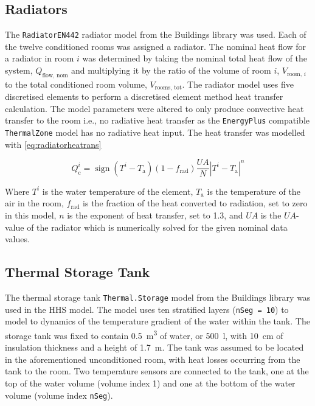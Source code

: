 \subsection{Radiators}
The \texttt{RadiatorEN442} radiator model from the Buildings library \cite{wetter_modelica_2014} was used. Each of the twelve conditioned rooms was assigned a radiator. The nominal heat flow for a radiator in room $i$ was determined by taking the nominal total heat flow of the system, $Q_\text{flow, nom}$ and multiplying it by the ratio of the volume of room $i$, $V_{\text{room, }i}$ to the total conditioned room volume, $V_\text{rooms, tot}$. The radiator model uses five discretised elements to perform a discretised element method heat transfer calculation. The model parameters were altered to only produce convective heat transfer to the room i.e., no radiative heat transfer as the \texttt{EnergyPlus} compatible \texttt{ThermalZone} model has no radiative heat input. The heat transfer was modelled with \cref{eq:radiatorheatrans} 


\begin{equation}
    Q_\text{c}^i=\operatorname{sign}(T^i-T_\text{a})(1-f_\text{rad})\frac{UA}{N}|T^i-T_\text{a}|^n\label{eq:radiatorheatrans}
\end{equation}

Where $T^i$ is the water temperature of the element, $T_\text{a}$ is the temperature of the air in the room, $f_\text{rad}$ is the fraction of the heat converted to radiation, set to zero in this model, $n$ is the exponent of heat transfer, set to 1.3, and $UA$ is the $UA$-value of the radiator which is numerically solved for the given nominal data values. 

\subsection{Thermal Storage Tank}
The thermal storage tank \texttt{Thermal.Storage} model from the Buildings library \cite{wetter_modelica_2014} was used in the \ac{HHS} model. The model uses ten stratified layers (\texttt{nSeg = 10}) to model to dynamics of the temperature gradient of the water within the tank. The storage tank was fixed to contain \qty{0.5}{\cubic\meter} of water, or \qty{500}{\litre}, with \qty{10}{\centi\meter} of insulation thickness and a height of \qty{1.7}{\meter}. The tank was assumed to be located in the aforementioned unconditioned room, with heat losses occurring from the tank to the room. Two temperature sensors are connected to the tank, one at the top of the water volume (volume index 1) and one at the bottom of the water volume (volume index \texttt{nSeg}). 

